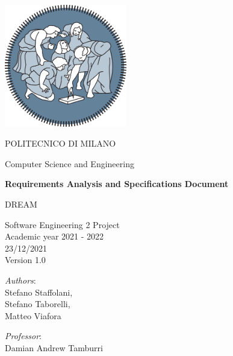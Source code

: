 \begin{titlepage}
    \begin{center}
		\includegraphics[width=0.4\textwidth]{Images/logo_polimi.png}
		
		\vspace{0.25cm}
		
		\LARGE POLITECNICO DI MILANO\\
		
		\vspace{0.2cm}
		
		\Large Computer Science and Engineering
		
		\vspace{0.8cm}
	
		\Huge \textbf{Requirements Analysis and Specifications Document}
		
		\vspace{0.5cm}
		\huge DREAM 
		
		\vspace{1.5cm}
		\LARGE Software Engineering 2 Project\\
		\Large Academic year 2021 - 2022\\
		\vspace{1cm}
		23/12/2021
		\\Version 1.0
		\vspace{2.5cm}
		
		\large
		\begin{minipage}{.1\textwidth}
			\null
		\end{minipage}%
		\begin{minipage}{.4\textwidth}
			\textit{Authors}:\\
			Stefano Staffolani,\\
			Stefano Taborelli,\\
			Matteo Viafora
		\end{minipage}%
		\begin{minipage}{.4\textwidth}
			\raggedleft	
			\textit{Professor}:\\
			Damian Andrew Tamburri\\
			\phantom{placeholder}
		\end{minipage}%
		\begin{minipage}{.1\textwidth}
			\null
		\end{minipage}
	
			
		\end{center}
\end{titlepage}